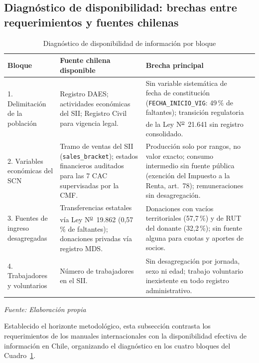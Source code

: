 \newpage
\subsection{Diagnóstico de disponibilidad: brechas entre requerimientos y fuentes chilenas}
\label{subsec:diagnostico-disponibilidad-ch4}  %

\begin{table}[htbp]
\centering
\caption{Diagnóstico de disponibilidad de información por bloque}
\label{tab:diagnostico_bloques}
\small
\renewcommand{\arraystretch}{1.4}
\begin{tabularx}{\textwidth}{@{} l X X c @{}}
\toprule
\textbf{Bloque} & \textbf{Fuente chilena disponible} & \textbf{Brecha principal} \\
\midrule
1. Delimitación de la población
& Registro DAES; actividades económicas del SII; Registro Civil para vigencia legal.
& Sin variable sistemática de fecha de constitución (\texttt{FECHA\_INICIO\_VIG}: 49\,\% de faltantes); transición regulatoria de la Ley N\textsuperscript{\underline{o}}~21.641 sin registro consolidado.
 \\

2. Variables económicas del SCN
& Tramo de ventas del SII (\texttt{sales\_bracket}); estados financieros auditados para las 7 CAC supervisadas por la CMF.
& Producción solo por rangos, no valor exacto; consumo intermedio sin fuente pública (exención del Impuesto a la Renta, art.~78); remuneraciones sin desagregación.
 \\

3. Fuentes de ingreso desagregadas
& Transferencias estatales vía Ley N\textsuperscript{\underline{o}}~19.862 (0{,}57\,\% de faltantes); donaciones privadas vía registro MDS.
& Donaciones con vacíos territoriales (57{,}7\,\%) y de RUT del donante (32{,}2\,\%); sin fuente alguna para cuotas y aportes de socios.
\\

4. Trabajadores y voluntarios
& Número de trabajadores en el SII.
& Sin desagregación por jornada, sexo ni edad; trabajo voluntario inexistente en todo registro administrativo.
\\
\bottomrule
\end{tabularx}

\vspace{0.5em}
\textit{Fuente: Elaboración propia }
\end{table}

Establecido el horizonte metodológico, esta subsección contrasta los requerimientos de los manuales internacionales con la disponibilidad efectiva de información en Chile, organizando el diagnóstico en los cuatro bloques del Cuadro~\ref{tab:diagnostico_bloques}.

